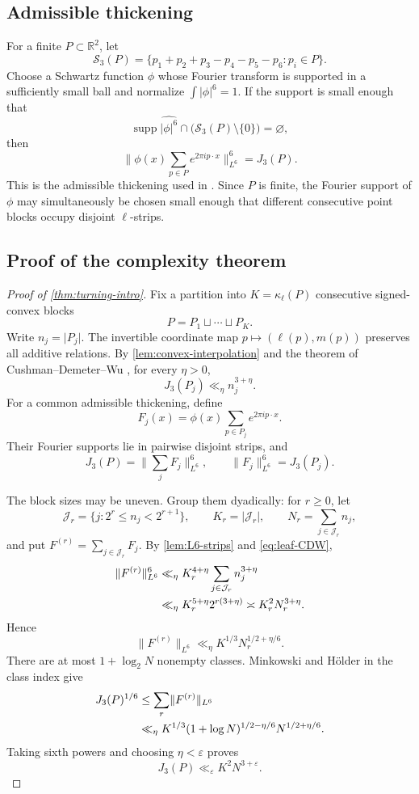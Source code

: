 \documentclass[11pt]{amsart}
\numberwithin{equation}{section}
\theoremstyle{definition}
\theoremstyle{remark}
\newcommand{\R}{\mathbb R}
\newcommand{\cJ}{\mathcal J}
\newcommand{\cS}{\mathcal S}
\newcommand{\supp}{\operatorname{supp}}
\newcommand{\eps}{\varepsilon}
\newcommand{\1}{\mathbf 1}
\newcommand{\card}[1]{\lvert #1\rvert}
\newcommand{\norm}[2][]{\lVert #2\rVert_{#1}}
\begin{document}
\subsection{Admissible thickening}
For a finite $P\subset\R^2$, let
\[
 \cS_3(P)=\{p_1+p_2+p_3-p_4-p_5-p_6:p_i\in P\}.
\]
Choose a Schwartz function $\phi$ whose Fourier transform is supported in a sufficiently small ball and normalize $\int|\phi|^6=1$.  If the support is small enough that
\[
 \supp\widehat{|\phi|^6}\cap\bigl(\cS_3(P)\setminus\{0\}\bigr)=\varnothing,
\]
then
\begin{equation}\label{eq:admissible-thickening}
 \norm[L^6]{\phi(x)\sum_{p\in P}e^{2\pi ip\cdot x}}^6=J_3(P).
\end{equation}
This is the admissible thickening used in \cite{CDW}.  Since $P$ is finite, the Fourier support of $\phi$ may simultaneously be chosen small enough that different consecutive point blocks occupy disjoint $\ell$-strips.

\subsection{Proof of the complexity theorem}
\begin{proof}[Proof of \cref{thm:turning-intro}]
Fix a partition into $K=\kappa_\ell(P)$ consecutive signed-convex blocks
\[
 P=P_1\sqcup\cdots\sqcup P_K.
\]
Write $n_j=\card{P_j}$.  The invertible coordinate map $p\mapsto(\ell(p),m(p))$ preserves all additive relations.  By \cref{lem:convex-interpolation} and the theorem of Cushman--Demeter--Wu \cite{CDW}, for every $\eta>0$,
\begin{equation}\label{eq:leaf-CDW}
 J_3(P_j)\ll_\eta n_j^{3+\eta}.
\end{equation}
For a common admissible thickening, define
\[
 F_j(x)=\phi(x)\sum_{p\in P_j}e^{2\pi ip\cdot x}.
\]
Their Fourier supports lie in pairwise disjoint strips, and
\[
 J_3(P)=\norm[L^6]{\sum_jF_j}^6,
 \qquad
 \norm[L^6]{F_j}^6=J_3(P_j).
\]

The block sizes may be uneven.  Group them dyadically: for $r\geq0$, let
\[
 \cJ_r=\{j:2^r\leq n_j<2^{r+1}\},
 \qquad
 K_r=\card{\cJ_r},
 \qquad
 N_r=\sum_{j\in\cJ_r}n_j,
\]
and put $F^{(r)}=\sum_{j\in\cJ_r}F_j$.  By \cref{lem:L6-strips} and \eqref{eq:leaf-CDW},
\begin{align}
 \norm[L^6]{F^{(r)}}^6
 &\ll_\eta K_r^{4+\eta}\sum_{j\in\cJ_r}n_j^{3+\eta}\notag\\
 &\ll_\eta K_r^{5+\eta}2^{r(3+\eta)}
 \asymp K_r^2N_r^{3+\eta}.
\end{align}
Hence
\[
 \norm[L^6]{F^{(r)}}
 \ll_\eta K^{1/3}N_r^{1/2+\eta/6}.
\]
There are at most $1+\log_2N$ nonempty classes.  Minkowski and H\"older in the class index give
\begin{align}
 J_3(P)^{1/6}
 &\leq\sum_r\norm[L^6]{F^{(r)}}\notag\\
 &\ll_\eta K^{1/3}
 (1+\log N)^{1/2-\eta/6}N^{1/2+\eta/6}.
\end{align}
Taking sixth powers and choosing $\eta<\eps$ proves
\[
 J_3(P)\ll_\eps K^2N^{3+\eps}.
\]
\end{proof}
\end{document}
